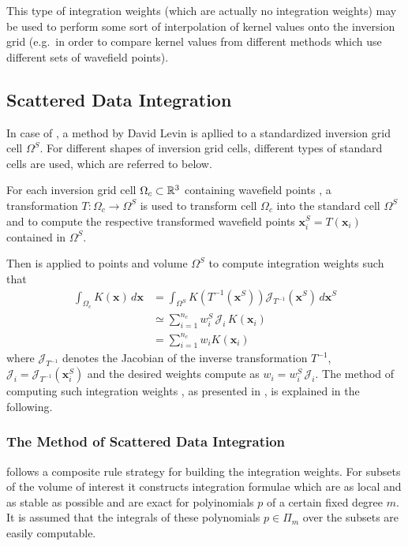 This type of integration weights (which are actually no integration weights) may be used to perform some 
sort of interpolation of kernel values onto the inversion grid (e.g.~in order to compare kernel values 
from different methods which use different sets of wavefield points).
%
\subsection{Scattered Data Integration} \label{programs_scripts,sec:fmod_intw,sub:SDI}
%
In case of , a method by David Levin \cite{Levin99} is apllied to a
standardized inversion grid cell $\Omega^S$. For different shapes of inversion grid cells, different 
types of standard cells are used, which are referred to below.

For each inversion grid cell $\Omega_c \subset \mathbb{R}^3$ containing wavefield points \wpG, a transformation 
$T : \Omega_c \rightarrow \Omega^S$ is used to transform cell $\Omega_c$ into the standard cell $\Omega^S$ 
and to compute the respective transformed wavefield points $\mathbf{x}_i^S = T\left(\mathbf{x}_i\right)$ 
contained in $\Omega^S$.

Then \cite{Levin99} is applied to points \wpS and volume $\Omega^S$ to compute integration weights \weightsS
such that
\begin{align}
\int_{\Omega_c} K(\mathbf{x})\,d\mathbf{x} &= 
           \int_{\Omega^S} K\left(T^{-1}\left(\mathbf{x}^S\right)\right) 
           \mathcal{J}_{T^{-1}}\left(\mathbf{x}^S\right)\,d\mathbf{x}^S \nonumber \\
  &\simeq \sum_{i=1}^{n_c} w^S_i\,\mathcal{J}_i\,K(\mathbf{x}_i) 
   \label{programs_scripts,sec:fmod_intw,eq:integration_standard} \\
  & = \sum_{i=1}^{n_c} w_iK(\mathbf{x}_i) \nonumber
\end{align}
where $\mathcal{J}_{T^{-1}}$ denotes the Jacobian of the inverse transformation $T^{-1}$, $\mathcal{J}_i = 
\mathcal{J}_{T^{-1}}\left(\mathbf{x}^S_i\right)$ and the desired weights compute as $w_i = w^S_i \, \mathcal{J}_i$. 
The method of computing such integration weights \weightsS, as presented in \cite{Levin99}, is explained in 
the following.
%
\subsubsection{The Method of Scattered Data Integration}
%
\cite{Levin99}{} follows a composite rule strategy for building the integration weights. For subsets of the 
volume of interest it constructs integration formulae which are as local and as stable as possible and are 
exact for polyinomials $p$ of a certain fixed degree $m$. It is assumed that the integrals of these polynomials 
$p\in\Pi_m$ over the subsets are easily computable.

